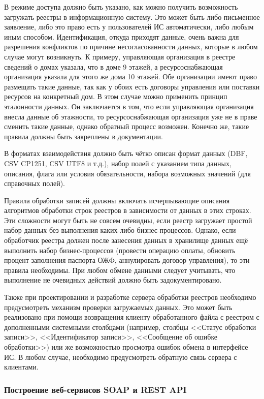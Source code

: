 В режиме доступа должно быть указано, как можно получить возможность загружать реестры в информационную систему.
Это может быть либо письменное заявление, либо это право есть у пользователей ИС автоматически, либо любым иным способом.
Идентификация, откуда приходят данные, очень важна для разрешения конфликтов по причине несогласованности данных, которые в любом случае могут возникнуть.
К примеру, управляющая организация в реестре сведений о домах указала, что в доме 9 этажей, а ресурсоснабжающая организация указала для этого же дома 10 этажей.
Обе организации имеют право размещать такие данные, так как у обоих есть договоры управления или поставки ресурсов на конкретный дом.
В этом случае можно применить принцип эталонности данных.
Он заключается в том, что если управляющая организация внесла данные об этажности, то ресурсоснабжающая организация уже не в праве сменить такие данные, однако обратный процесс возможен.
Конечно же, такие правила должны быть закреплены в документации.

В форматах взаимодействия должно быть чётко описан формат данных (DBF, CSV CP1251, CSV UTF8 и т.д.), набор полей с указанием типа данных, описания, флага или условия обязательности, набора возможных значений (для справочных полей).

Правила обработки записей должны включать исчерпывающие описания алгоритмов обработки строк реестров в зависимости от данных в этих строках.
Эти сложности могут быть не совсем очевидны, если реестр загружает простой набор данных без выполнения каких-либо бизнес-процессов.
Однако, если обработчик реестра должен после занесения данных в хранилище данных ещё выполнить набор бизнес-процессов (провести операцию оплаты, обновить процент заполнения паспорта ОЖФ, аннулировать договор управления), то эти правила необходимы.
При любом обмене данными следует учитывать, что выполнение не очевидных действий должно быть задокументировано.

Также при проектировании и разработке сервера обработки реестров необходимо предусмотреть механизм проверки загружаемых данных.
Это может быть реализовано при помощи возвращения клиенту обработанного файла с реестром с дополненными системными столбцами (например, столбцы <<Статус обработки записи>>, <<Идентификатор записи>>, <<Сообщение об ошибке обработки>>) или же возможностью просмотра ошибок обмена в интерфейсе ИС.
В любом случае, необходимо предусмотреть обратную связь сервера с клиентами.

\subsubsection{Построение веб-сервисов SOAP и REST API}

